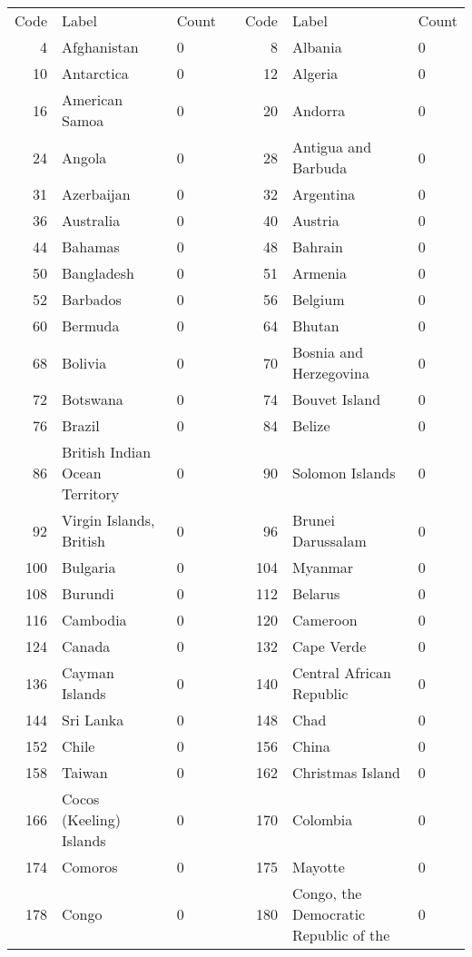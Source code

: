 \documentclass{article}
\begin{document}
\begin{longtabu} to 
\toprule
{{Code}} & {{Label}} & {{Count}} & {{}} & {{Code}} & {{Label}} & {{Count}}\\
\cmidrule(l){1-3}\cmidrule(l){5-7}

4 & Afghanistan & 0 &  & 8 & Albania & 0\\
10 & Antarctica & 0 &  & 12 & Algeria & 0\\
16 & American Samoa & 0 &  & 20 & Andorra & 0\\
24 & Angola & 0 &  & 28 & Antigua and Barbuda & 0\\
31 & Azerbaijan & 0 &  & 32 & Argentina & 0\\
36 & Australia & 0 &  & 40 & Austria & 0\\
44 & Bahamas & 0 &  & 48 & Bahrain & 0\\
50 & Bangladesh & 0 &  & 51 & Armenia & 0\\
52 & Barbados & 0 &  & 56 & Belgium & 0\\
60 & Bermuda & 0 &  & 64 & Bhutan & 0\\
68 & Bolivia & 0 &  & 70 & Bosnia and Herzegovina & 0\\
72 & Botswana & 0 &  & 74 & Bouvet Island & 0\\
76 & Brazil & 0 &  & 84 & Belize & 0\\
86 & British Indian Ocean Territory & 0 &  & 90 & Solomon Islands & 0\\
92 & Virgin Islands, British & 0 &  & 96 & Brunei Darussalam & 0\\
100 & Bulgaria & 0 &  & 104 & Myanmar & 0\\
108 & Burundi & 0 &  & 112 & Belarus & 0\\
116 & Cambodia & 0 &  & 120 & Cameroon & 0\\
124 & Canada & 0 &  & 132 & Cape Verde & 0\\
136 & Cayman Islands & 0 &  & 140 & Central African Republic & 0\\
144 & Sri Lanka & 0 &  & 148 & Chad & 0\\
152 & Chile & 0 &  & 156 & China & 0\\
158 & Taiwan & 0 &  & 162 & Christmas Island & 0\\
166 & Cocos (Keeling) Islands & 0 &  & 170 & Colombia & 0\\
174 & Comoros & 0 &  & 175 & Mayotte & 0\\
178 & Congo & 0 &  & 180 & Congo, the Democratic Republic of the & 0\\

\end{longtabu}
\end{document}
